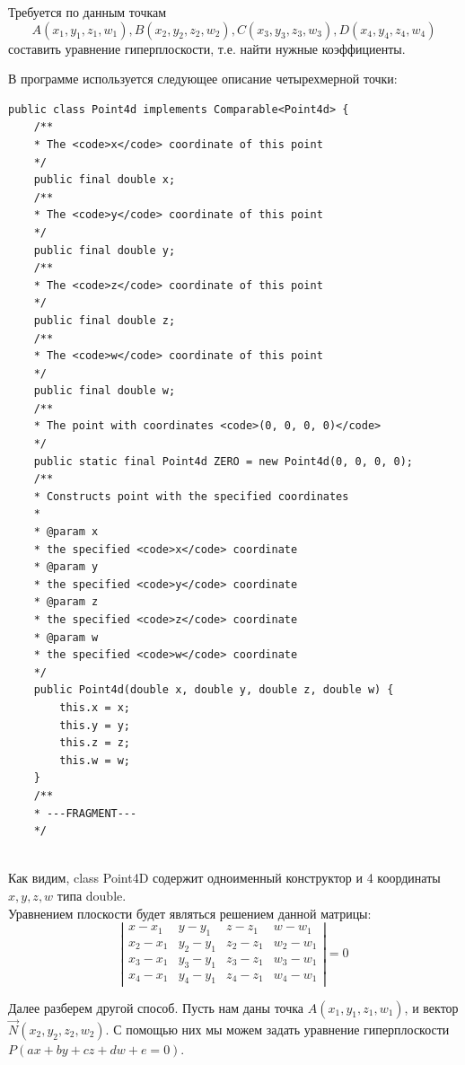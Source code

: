 \documentclass[12pt, a4paper, twoside]{report}
\begin{document}
Требуется по данным точкам $$A(x_1,y_1,z_1,w_1), B(x_2,y_2,z_2,w_2), C(x_3,y_3,z_3,w_3), D(x_4,y_4,z_4,w_4)$$ составить уравнение гиперплоскости, т.е. найти нужные коэффициенты.

В программе используется следующее описание четырехмерной точки:
\begin{lstlisting}
public class Point4d implements Comparable<Point4d> {
	/**
	* The <code>x</code> coordinate of this point
	*/
	public final double x;
	/**
	* The <code>y</code> coordinate of this point
	*/
	public final double y;
	/**
	* The <code>z</code> coordinate of this point
	*/
	public final double z;
	/**
	* The <code>w</code> coordinate of this point
	*/
	public final double w;
	/**
	* The point with coordinates <code>(0, 0, 0, 0)</code>
	*/
	public static final Point4d ZERO = new Point4d(0, 0, 0, 0);
	/**
	* Constructs point with the specified coordinates
	*
	* @param x
	* the specified <code>x</code> coordinate
	* @param y
	* the specified <code>y</code> coordinate
	* @param z
	* the specified <code>z</code> coordinate
	* @param w
	* the specified <code>w</code> coordinate
	*/
	public Point4d(double x, double y, double z, double w) {
		this.x = x;
		this.y = y;
		this.z = z;
		this.w = w;
	}
	/** 
	* ---FRAGMENT---
	*/
\end{lstlisting}
\\

Как видим, class Point4D содержит одноименный конструктор и 4 координаты $x,y,z,w$ типа double.
\\

Уравнением плоскости будет являться решением данной матрицы: $$ \left|
		\begin{array}{cccc}
			x-x_1 & y-y_1 & z-z_1 & w-w_1     \\
			x_2-x_1 & y_2-y_1 & z_2-z_1 & w_2-w_1    \\
			x_3-x_1 & y_3-y_1 & z_3-z_1 & w_3-w_1      \\
			x_4-x_1 & y_4-y_1 & z_4-z_1 & w_4-w_1 
		\end{array}
	\right|=0

$$

Далее разберем другой способ. Пусть нам даны точка $A(x_1,y_1,z_1,w_1)$, и вектор $\vec N(x_2,y_2,z_2,w_2)$. С помощью них мы можем задать уравнение гиперплоскости $P(ax + by + cz + dw + e=0)$.
\end{document}
